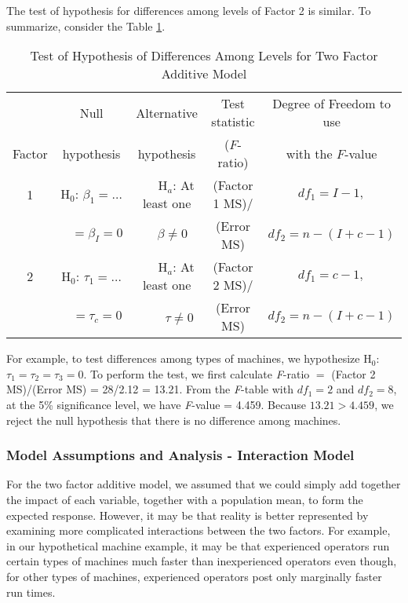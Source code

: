 The test of hypothesis for differences among levels of Factor 2 is
similar. To summarize, consider the Table \ref{T4:TwoFactorTests}.


  \begin{center}  \begin{table}[h]
\caption{\label{T4:TwoFactorTests} Test of Hypothesis of Differences
Among Levels for Two Factor Additive Model}

\begin{tabular}{ccccc}
\hline & Null & Alternative & Test statistic & Degree of Freedom to
use \\
Factor & hypothesis & hypothesis & ($F$-ratio) & with the $F$-value \\
\hline 1 & H$_{0}$: $\beta _{1}=\ldots$ & ~~~H$_{a}$: At least one  & (Factor 1 MS)/ & $df_{1}=I-1,$  \\
&  $~~~~=\beta _{I}=0$ & $
~~~~\beta \neq 0$ & (Error MS) &  $df_{2}=n-(I+c-1)$\\
2 & H$_{0}$: $\tau _{1}=\ldots $  & ~~~H$_{a}$: At least one  & (Factor 2 MS)/ & $df_{1}=c-1,$  \\
& $~~~~=\tau _{c}=0$ &  ~~~~$\tau \neq 0$& (Error MS) &
$df_{2}=n-(I+c-1)$ \\ \hline
\end{tabular}

\end{table}  \end{center}  

For example, to test differences among types of machines, we hypothesize H$%
_{0}$: $\tau _{1}=\tau _{2}=\tau _{3}=0$. To perform the test, we
first calculate \textit{F}-ratio $=$ (Factor 2 MS)/(Error MS) =
28/2.12 = 13.21. From the \textit{F}-table with $df_{1}=2$ and
$df_{2}=8$, at the 5\% significance level, we have \textit{F}-value
= 4.459. Because $13.21>4.459$, we reject the null hypothesis that
there is no difference among machines.


\subsubsection*{Model Assumptions and Analysis - Interaction Model}

For the two factor additive model, we assumed that we could simply
add together the impact of each variable, together with a population
mean, to form the expected response. However, it may be that reality
is better represented by examining more complicated interactions
between the two factors. For example, in our hypothetical machine
example, it may be that experienced operators run certain types of
machines much faster than inexperienced operators even though, for
other types of machines, experienced operators post only marginally
faster run times.

